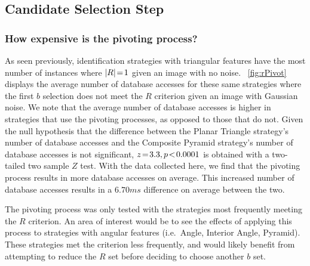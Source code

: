 \subsection{Candidate Selection Step}\label{subsec:candidateSelectionStep}
\begin{figure}
\end{figure}

\subsubsection{How expensive is the pivoting process?}
As seen previously, identification strategies with triangular features have the most number of instances where
$\left| R \right| \!=\! 1$ given an image with no noise.
~\autoref{fig:rPivot} displays the average number of database accesses for these same strategies where the first
$b$ selection does not meet the $R$ criterion given an image with Gaussian noise.
We note that the average number of database accesses is higher in strategies that use the pivoting processes,
as opposed to those that do not.
Given the null hypothesis that the difference between the Planar Triangle strategy's number of database accesses and
the Composite Pyramid strategy's number of database accesses is not significant, $z \!=\! 3.3, p\!<\!0.0001$ is
obtained with a two-tailed two sample $Z$ test.
With the data collected here, we find that the pivoting process results in more database accesses on average.
This increased number of database accesses results in a $6.70\si{ms}$ difference on average between the two.

The pivoting process was only tested with the strategies most frequently meeting the $R$ criterion.
An area of interest would be to see the effects of applying this process to strategies with angular features 
(i.e.\ Angle, Interior Angle, Pyramid).
These strategies met the criterion less frequently, and would likely benefit from attempting to reduce the $R$ set
before deciding to choose another $b$ set.

